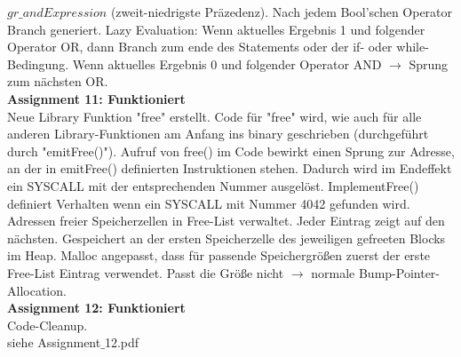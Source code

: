 \documentclass[10pt, a4paper]{article}
\begin{document}
$gr\_andExpression$ (zweit-niedrigste Präzedenz). Nach jedem Bool'schen Operator Branch generiert. Lazy Evaluation: Wenn aktuelles Ergebnis 1 und folgender Operator OR, dann Branch zum ende des Statements oder der if- oder while-Bedingung. Wenn aktuelles Ergebnis 0 und folgender Operator AND $\rightarrow$ Sprung zum nächsten OR.
\\
\textbf{Assignment 11: Funktioniert}\\
Neue Library Funktion "free" erstellt. Code für "free" wird, wie auch für alle anderen Library-Funktionen am Anfang ins binary geschrieben (durchgeführt durch "emitFree()"). Aufruf von free() im Code bewirkt einen Sprung zur Adresse, an der in emitFree() definierten Instruktionen stehen. Dadurch wird im Endeffekt ein SYSCALL mit der entsprechenden Nummer ausgelöst. ImplementFree() definiert Verhalten wenn ein SYSCALL mit Nummer 4042 gefunden wird. Adressen freier Speicherzellen in Free-List verwaltet. Jeder Eintrag zeigt auf den nächsten. Gespeichert an der ersten Speicherzelle des jeweiligen gefreeten Blocks im Heap. Malloc angepasst, dass für passende Speichergrößen zuerst der erste Free-List Eintrag verwendet. Passt die Größe nicht $\rightarrow$ normale Bump-Pointer-Allocation. 
\\
\textbf{Assignment 12: Funktioniert}\\
Code-Cleanup.\\
siehe Assignment$\_$12.pdf
\end{document}

